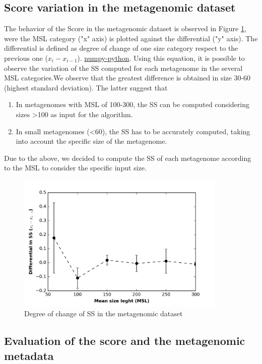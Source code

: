 \documentclass[12pt]{report}
\begin{document}
\subsection{Score variation in the metagenomic dataset }

The behavior of the Score in the metagenomic dataset is observed in Figure
\ref{fig:differential}, were the MSL category ("x" axis) is plotted against the
differential ("y" axis). The differential is defined as degree of change of one
size category respect to the previous one ($x_i - x_{i-1}$).
\href{https://docs.scipy.org/doc/numpy/reference/generated/numpy.diff.html}{numpy-python}.
Using this equation, it is possible to observe the variation of the SS computed
for each metagenome in the several MSL categories.We observe that the greatest
difference is obtained in size 30-60 (highest standard deviation). The latter
suggest that  
\begin{enumerate}
\item In metagenomes with MSL of 100-300, the SS can be computed considering
sizes >100 as input for the algorithm. 
\item In small metagenomes (<60), the SS has to be accurately computed, taking into account the specific size of the metagenome.
\end{enumerate} 
Due to the above, we decided to compute the SS of each metagenome according to
the MSL to consider the specific input size.   


\begin{figure}[H]
  \centering
    \includegraphics[width=100mm, scale =0.5]{Score_data_behaviour7.png}
    \caption{Degree of change of SS in the metagenomic dataset }
        \label{fig:differential}
\end{figure}

\subsection{Evaluation of the score and the metagenomic metadata}
  
\end{document}
